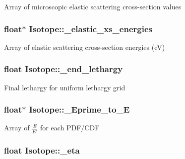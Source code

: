Array of microscopic elastic scattering cross-\/section values \hypertarget{classIsotope_aad8251fb7fd6d073f60653b0bdce0c07}{
\subsubsection[{\-\_\-elastic\-\_\-xs\-\_\-energies}]{\setlength{\rightskip}{0pt plus 5cm}float$\ast$ Isotope\-::\-\_\-elastic\-\_\-xs\-\_\-energies\hspace{0.3cm}{\ttfamily [private]}}}\label{classIsotope_aad8251fb7fd6d073f60653b0bdce0c07}
Array of elastic scattering cross-\/section energies (e\-V) \hypertarget{classIsotope_ab94eea749f1536859dcd6c89c514a614}{
\subsubsection[{\-\_\-end\-\_\-lethargy}]{\setlength{\rightskip}{0pt plus 5cm}float Isotope\-::\-\_\-end\-\_\-lethargy\hspace{0.3cm}{\ttfamily [private]}}}\label{classIsotope_ab94eea749f1536859dcd6c89c514a614}
Final lethargy for uniform lethargy grid \hypertarget{classIsotope_a3f3437fabe8c5b6108080f150b854fda}{
\subsubsection[{\-\_\-\-Eprime\-\_\-to\-\_\-\-E}]{\setlength{\rightskip}{0pt plus 5cm}float$\ast$ Isotope\-::\-\_\-\-Eprime\-\_\-to\-\_\-\-E\hspace{0.3cm}{\ttfamily [private]}}}\label{classIsotope_a3f3437fabe8c5b6108080f150b854fda}
Array of $ \frac{E}{E'} $ for each P\-D\-F/\-C\-D\-F \hypertarget{classIsotope_a50668f89ec4d8218cab1339edab4c222}{
\subsubsection[{\-\_\-eta}]{\setlength{\rightskip}{0pt plus 5cm}float Isotope\-::\-\_\-eta\hspace{0.3cm}{\ttfamily [private]}}}\label{classIsotope_a50668f89ec4d8218cab1339edab4c222}
